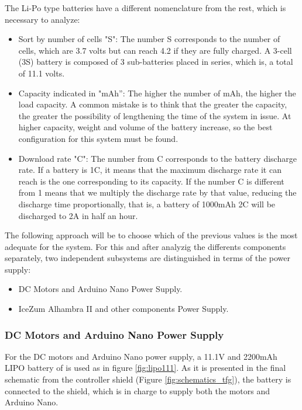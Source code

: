 The Li-Po type batteries have a different nomenclature from the rest, which is necessary to analyze:

\begin{itemize}
	\item Sort by number of cells "S": The number S corresponds to the number of cells, which are 3.7 volts but can reach 4.2 if they are fully charged. A 3-cell (3S) battery is composed of 3 sub-batteries placed in series, which is, a total of 11.1 volts.
	\item Capacity indicated in "mAh”: The higher the number of mAh, the higher the load capacity. A common mistake is to think that the greater the capacity, the greater the possibility of lengthening the time of the system in issue. At higher capacity, weight and volume of the battery increase, so the best configuration for this system must be found.
	\item Download rate "C": The number from C corresponds to the battery discharge rate. If a battery is 1C, it means that the maximum discharge rate it can reach is the one corresponding to its capacity. If the number C is different from 1 means that we multiply the discharge rate by that value, reducing the discharge time proportionally, that is, a battery of 1000mAh 2C will be discharged to 2A in half an hour.
\end{itemize}

The following approach will be to choose which of the previous values is the most adequate for the system. For this and after analyzig the differents components separately, two independent subsystems are distinguished in terms of the power supply:

\begin{itemize}
	\item DC Motors and Arduino Nano Power Supply.
	\item IceZum Alhambra II and other components Power Supply.
\end{itemize}

\subsubsection{DC Motors and Arduino Nano Power Supply}
For the DC motors and Arduino Nano power supply, a 11.1V and 2200mAh LIPO battery of is used as in figure \ref{fig:lipo111}. As it is presented in the final schematic from the controller
shield (Figure \ref{fig:schematics_tfg}), the battery is connected to the shield, which is in charge to supply both the motors and Arduino Nano.

